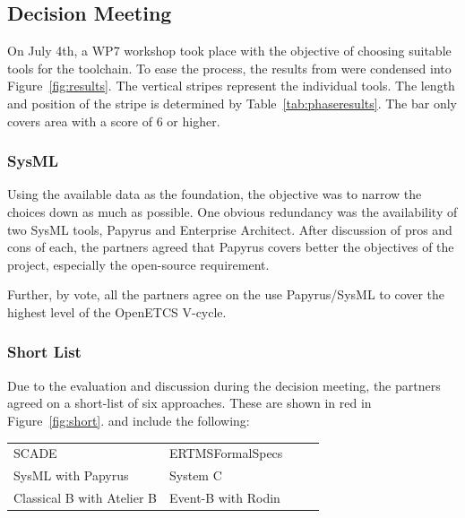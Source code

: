 \subsection{Decision Meeting}
\label{sec:decision_meeting}

On July 4th, a WP7 workshop took place with the objective of choosing suitable tools for the toolchain.  To ease the process, the results from \citep{WP7_O719} were condensed into Figure~\ref{fig:results}.  The vertical stripes represent the individual tools.  The length and position of the stripe is determined by Table~\ref{tab:phaseresults}. The bar only covers area with a score of 6 or higher.

\subsubsection{SysML}

Using the available data as the foundation, the objective was to narrow the choices down as much as possible.  One obvious redundancy was the availability of two SysML tools, Papyrus and Enterprise Architect. After discussion of pros and cons of each, the partners agreed that Papyrus covers better the objectives of the project, especially the open-source requirement. 

Further, by vote, all the partners agree on the use Papyrus/SysML to cover the highest level of the  OpenETCS V-cycle.

\subsubsection{Short List}

Due to the evaluation and discussion during the decision meeting, the partners agreed on a short-list of six approaches. These are shown in red in Figure~\ref{fig:short}. and include the following:

\begin{tabular}{ p{0.5\linewidth} p{0.5\linewidth} }
SCADE & ERTMSFormalSpecs \\
SysML with Papyrus & System C \\
Classical B with Atelier B & Event-B with Rodin
\end{tabular}


